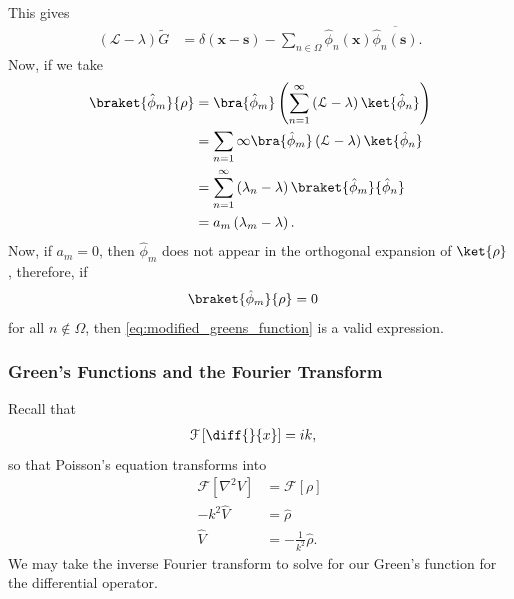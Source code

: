 \documentclass[10pt]{mypackage}
\begin{document}
  This gives
  \begin{align*}
    \left( \mathcal{L}-\lambda \right)\widetilde{G} &= \delta\left( \mathbf{x}-\mathbf{s} \right) - \sum_{n\in\Omega} \hat{\phi}_n\left( \mathbf{x} \right) \overline{\hat{\phi}_n\left( \mathbf{s} \right)}.
  \end{align*}
  Now, if we take
  \begin{align*}
    \braket{\hat{\phi}_m}{\rho} &= \bra{\hat{\phi}_m}\left( \sum_{n=1}^{\infty}\left( \mathcal{L}-\lambda \right)\ket{\hat{\phi}_n} \right)\\
                                &= \sum_{n=1}{\infty} \bra{\hat{\phi}_m} \left( \mathcal{L}-\lambda \right)\ket{\hat{\phi}_n}\\
                                &= \sum_{n=1}^{\infty}\left( \lambda_n-\lambda \right)\braket{\hat{\phi}_m}{\hat{\phi}_n}\\
                                &= a_m\left( \lambda_m-\lambda \right).
  \end{align*}
  Now, if $a_m = 0$, then $\hat{\phi}_m$ does not appear in the orthogonal expansion of $\ket{\rho}$, therefore, if
  \begin{align*}
    \braket{\hat{\phi}_m}{\rho} &= 0
  \end{align*}
  for all $n\notin \Omega$, then \eqref{eq:modified_greens_function} is a valid expression.
  \subsubsection{Green's Functions and the Fourier Transform}%
  Recall that
  \begin{align*}
    \mathcal{F}\left[ \diff{}{x} \right] &= ik,
  \end{align*}
  so that Poisson's equation transforms into
  \begin{align*}
    \mathcal{F}\left[ \nabla^2 V \right] &= \mathcal{F}\left[ \rho \right]\\
    -k^2\hat{V} &= \hat{\rho}\\
    \hat{V} &= -\frac{1}{k^2}\hat{\rho}.
  \end{align*}
  We may take the inverse Fourier transform to solve for our Green's function for the differential operator.
\end{document}
